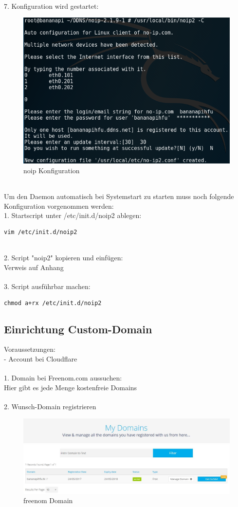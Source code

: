 ~\\
7. Konfiguration wird gestartet:
\begin{figure}[ht]
\includegraphics[width=\textwidth]{pictures/Jonas/noip_Konfiguration}
\caption{noip Konfiguration}
\end{figure}

~\\
Um den Daemon automatisch bei Systemstart zu starten muss noch folgende Konfiguration vorgenommen werden:\\
1. Startscript unter /etc/init.d/noip2 ablegen:
\begin{lstlisting}
vim /etc/init.d/noip2
\end{lstlisting}
~\\
2. Script "noip2" kopieren und einfügen:\\
Verweis auf Anhang\\
~\\
3. Script ausführbar machen:
\begin{lstlisting}
chmod a+rx /etc/init.d/noip2
\end{lstlisting}
\newpage
\subsection{Einrichtung Custom-Domain}
Voraussetzungen:\\
- Account bei Cloudflare\\
~\\
1. Domain bei Freenom.com aussuchen:\\
Hier gibt es jede Menge kostenfreie Domains\\
~\\
2. Wunsch-Domain registrieren\\
\begin{figure}[ht]
\includegraphics[width=\textwidth]{pictures/Jonas/freenom_Domain}
\caption{freenom Domain}
\end{figure}

